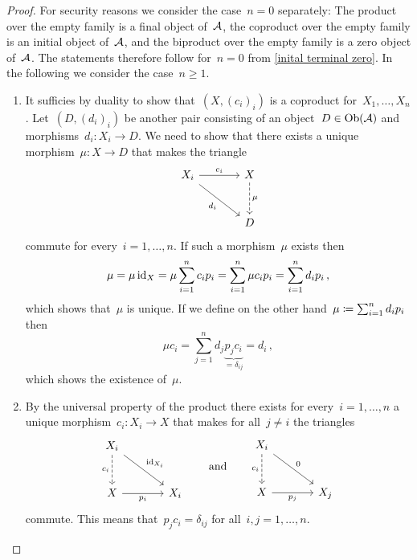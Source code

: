 \begin{proof}
  For security reasons we consider the case~$n = 0$ separately:
  The product over the empty family is a final object of~$\mathcal{A}$, the coproduct over the empty family is an initial object of~$\mathcal{A}$, and the biproduct over the empty family is a zero object of~$\mathcal{A}$.
  The statements therefore follow for~$n = 0$ from \cref{inital terminal zero}.
  In the following we consider the case~$n \geq 1$.
  \begin{enumerate}
    \item
      It sufficies by duality to show that~$(X, (c_i)_i)$ is a coproduct for~$X_1, \dotsc, X_n$.
      Let~$(D, (d_i)_i)$ be another pair consisting of an object~$D \in \operatorname{Ob}(\mathcal{A})$ and morphisms~$d_i \colon X_i \to D$.
      We need to show that there exists a unique morphism~$\mu \colon X \to D$ that makes the triangle
      \[
        \begin{tikzcd}[sep = large]
            X_i
            \arrow{r}[above]{c_i}
            \arrow{dr}[below left]{d_i}
          & X
            \arrow[dashed]{d}[right]{\mu}
          \\
            {}
          & D
        \end{tikzcd}
      \]
      commute for every~$i = 1, \dotsc, n$. 
      If such a morphism~$\mu$ exists then
      \[
          \mu
        = \mu \operatorname{id}_X
        = \mu \sum_{i=1}^n c_i p_i
        = \sum_{i=1}^n \mu c_i p_i
        = \sum_{i=1}^n d_i p_i \,,
      \]
      which shows that~$\mu$ is unique.
      If we define on the other hand~$\mu \coloneqq \sum_{i=1}^n d_i p_i$ then
      \[
          \mu c_i
        = \sum_{j=1}^n d_j \underbrace{p_j c_i}_{= \delta_{ij}}
        = d_i \,,
      \]
      which shows the existence of~$\mu$.
    \item
      By the universal property of the product there exists for every~$i = 1, \dotsc, n$ a unique morphism~$c_i \colon X_i \to X$ that makes for all~$j \neq i$ the triangles
      \[
        \begin{tikzcd}[sep = large]
            X_i
            \arrow{dr}[above right]{\id_{X_i}}
            \arrow[dashed]{d}[left]{c_i}
          & {}
          \\
            X
            \arrow{r}[below]{p_i}
          & X_i
        \end{tikzcd}
        \qquad\text{and}\qquad
        \begin{tikzcd}[sep = large]
            X_i
            \arrow{dr}[above right]{0}
            \arrow[dashed]{d}[left]{c_i}
          & {}
          \\
            X
            \arrow{r}[below]{p_j}
          & X_j
        \end{tikzcd}
      \]
      commute.
      This means that~$p_j c_i = \delta_{ij}$ for all~$i, j = 1, \dotsc, n$.
      

\end{enumerate}
\end{proof}
